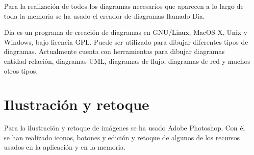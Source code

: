 Para la realización de todos los diagramas necesarios que aparecen a lo largo de toda la memoria se ha usado el creador de diagramas llamado Dia.\\


Dia es un programa de creación de diagramas en GNU/Linux, MacOS X, Unix y Windows, bajo licencia GPL. Puede ser utilizado para dibujar diferentes tipos de diagramas. Actualmente cuenta con herramientas para dibujar diagramas entidad-relación, diagramas UML, diagramas de flujo, diagramas de red y muchos otros tipos.

\section{Ilustración y retoque}

Para la ilustración y retoque de imágenes se ha usado Adobe Photoshop. Con él se han realizado iconos, botones y edición y retoque de algunos de los recursos usados en la aplicación y en la memoria.

